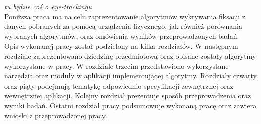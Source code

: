 \textit{tu będzie coś o eye-trackingu}\\[\baselineskip]
Poniższa praca ma na celu zaprezentowanie algorytmów wykrywania fiksacji z danych pobranych za pomocą urządzenia fizycznego, jak również porównania wybranych algorytmów, oraz omówienia wyników przeprowadzonych badań.\\[\baselineskip]
Opis wykonanej pracy został podzielony na kilka rozdziałów. W następnym rozdziale zaprezentowano dziedzinę przedmiotową oraz opisane zostały algorytmy wykorzystane w pracy. W rozdziale trzecim przedstawiono wykorzystane narzędzia oraz moduły w aplikacji implementującej algorytmy. Rozdziały czwarty oraz piąty podejmują tematykę odpowiednio specyfikacji zewnętrznej oraz wewnętrznej aplikacji. Kolejny rozdział prezentuje sposób przeprowadzenia oraz wyniki badań. Ostatni rozdział pracy podsumowuje wykonaną pracę oraz zawiera wnioski z przeprowadzonej pracy.